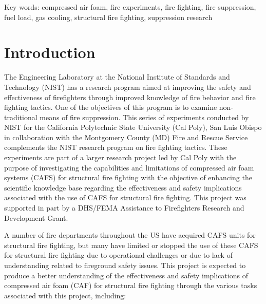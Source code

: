 \documentclass[12pt,oneside]{book}
\begin{document}
\vspace{0.5in}
Key words: compressed air foam, fire experiments, fire fighting, fire suppression, fuel load, gas cooling, structural fire fighting, suppression research  


\chapter{Introduction}
\label{chap:Introduction}
\setcounter{page}{1}

The Engineering Laboratory at the National Institute of Standards and Technology (NIST) has a research program aimed at improving the safety and effectiveness of firefighters through improved knowledge of fire behavior and fire fighting tactics. One of the objectives of this program is to examine non-traditional means of fire suppression. This series of experiments conducted by NIST for the California Polytechnic State University (Cal Poly), San Luis Obispo in collaboration with the Montgomery County (MD) Fire and Rescue Service complements the NIST research program on fire fighting tactics. These experiments are part of a larger research project led by Cal Poly with the purpose of investigating the capabilities and limitations of compressed air foam systems (CAFS) for structural fire fighting with the objective of enhancing the scientific knowledge base regarding the effectiveness and safety implications associated with the use of CAFS for structural fire fighting. This project was supported in part by a DHS/FEMA Assistance to Firefighters Research and Development Grant.

A number of fire departments throughout the US have acquired CAFS units for structural fire fighting, but many have limited or stopped the use of these CAFS for structural fire fighting due to operational challenges or due to lack of understanding related to fireground safety issues. This project is expected to produce a better understanding of the effectiveness and safety implications of compressed air foam (CAF) for structural fire fighting through the various tasks associated with this project, including: 
\end{document}
